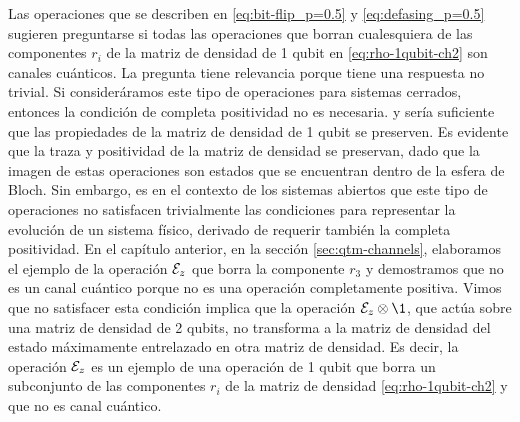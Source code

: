 Las operaciones 	que se describen en \eqref{eq:bit-flip_p=0.5}
y \eqref{eq:defasing_p=0.5} sugieren preguntarse si todas las
operaciones que borran cualesquiera de las componentes $r_i$ 
de la matriz de densidad de 1 qubit 
en \eqref{eq:rho-1qubit-ch2} son canales cuánticos.
La pregunta tiene relevancia porque tiene una respuesta no trivial.
Si consideráramos este tipo de operaciones para sistemas 
cerrados, entonces la condición de completa positividad no es necesaria. 
y sería suficiente que las propiedades de la matriz de densidad de 1 
qubit se preserven. Es evidente que la traza y positividad de la matriz de 
densidad se preservan, dado que la imagen de estas operaciones son estados que se encuentran dentro de la esfera 
de Bloch. Sin embargo, es en el contexto de los sistemas
abiertos que este tipo de operaciones no satisfacen trivialmente
las condiciones para representar la evolución de un sistema físico, derivado 
de requerir también la completa positividad. 
En el capítulo anterior, en la sección 
\ref{sec:qtm-channels}, elaboramos el ejemplo de la operación $\mathcal{E}_z$
que borra la componente $r_3$ y demostramos que no es un canal 
cuántico porque no es una operación completamente positiva. 
Vimos que no satisfacer esta condición implica que la operación 
$\E_z\ot\1$, que actúa sobre una matriz de densidad de 2 qubits,
no transforma a la matriz 
de densidad del estado máximamente entrelazado en otra 
matriz de densidad.
Es decir, la operación $\mathcal{E}_z$ es un ejemplo de una 
operación de 1 qubit que borra un subconjunto de las componentes $r_i$ de 
la matriz de densidad \eqref{eq:rho-1qubit-ch2} y que no es canal cuántico.

